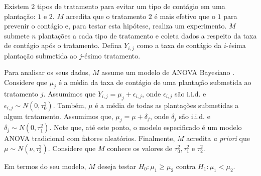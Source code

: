 \begin{exercise}
 \label{ex:bayesian-anova}
 Existem $2$ tipos de tratamento para 
 evitar um tipo de contágio em uma plantação: $1$ e $2$.
 $M$ acredita que o tratamento $2$ é 
 mais efetivo que o $1$ para prevenir o contágio e,
 para testar esta hipótese, realiza um experimento.
 $M$ submete $n$ plantações a cada tipo de tratamento e
 coleta dados a respeito da taxa de contágio 
 após o tratamento.
 Defina $Y_{i,j}$ como a taxa de contágio da 
 $i$-ésima plantação submetida ao 
 $j$-ésimo tratamento.
 
 Para analisar os seus dados, 
 $M$ assume um modelo de ANOVA Bayesiano
 \citep{Geinitz2013}.
 Considere que $\mu_{j}$ é 
 a média da taxa de contágio de uma plantação 
 submetida ao tratamento $j$.
 Assumimos que $Y_{i,j} = \mu_{j} + \epsilon_{i,j}$, 
 onde $\epsilon_{i,j}$ são i.i.d. e 
 $\epsilon_{i,j} \sim N(0, \tau_{0}^{2})$.
 Também, $\mu$ é a média de 
 todas as plantações submetidas a algum tratamento.
 Assumimos que, $\mu_{j} = \mu + \delta_{j}$, onde
 $\delta_{j}$ são i.i.d. e 
 $\delta_{j} \sim N(0,\tau_{1}^{2})$.
 Note que, até este ponto, o modelo especificado é
 um modelo ANOVA tradicional com fatores aleatórios.
 Finalmente, $M$ acredita \emph{a priori} que 
 $\mu \sim N(\nu,\tau_{2}^{2})$.
 Considere que $M$ conhece os valores de 
 $\tau_{0}^{2}, \tau_{1}^{2}$ e $\tau_{2}^{2}$.

 Em termos do seu modelo, 
 $M$ deseja testar $H_{0}: \mu_{1} \geq \mu_{2}$
 contra $H_{1}: \mu_{1} < \mu_{2}$.
\end{exercise}

